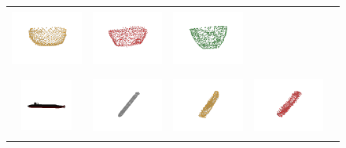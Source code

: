 \documentclass[bachelor, nocolorlinks, printoneside]{seuthesis} %
\begin{document}
\begin{Appendix}{}
\begin{figure}[!h]
\begin{tabular}{c@{}c@{}c@{}c@{}c@{}}
            \includegraphics[width=0.18\columnwidth,height=2cm]{figs/supp_real_dataset/AE_label/pot_490e2e25da735cfd3df324363ca0723f_label.png} &
            \includegraphics[width=0.18\columnwidth,height=2cm]{figs/supp_real_dataset/AE/pot_490e2e25da735cfd3df324363ca0723f_pred.png} &
            \includegraphics[width=0.18\columnwidth,height=2cm]{figs/supp_real_dataset/oracle/pot_490e2e25da735cfd3df324363ca0723f_oracle.png} \\
            \vspace{-5mm}
            \includegraphics[width=0.11\columnwidth,height=1.7cm]{figs/supp_real_dataset/Image/rocket_99314b704285c0ca16e3314677399d49.png} &
            \includegraphics[width=0.18\columnwidth,height=2cm]{figs/supp_real_dataset/GT/rocket_99314b704285c0ca16e3314677399d49_gt.png} &
            \includegraphics[width=0.18\columnwidth,height=2cm]{figs/supp_real_dataset/AE_label/rocket_99314b704285c0ca16e3314677399d49_label.png} &
            \includegraphics[width=0.18\columnwidth,height=2cm]{figs/supp_real_dataset/AE/rocket_99314b704285c0ca16e3314677399d49_pred.png} &

\end{tabular}
\end{figure}
\end{Appendix}
\end{document}
